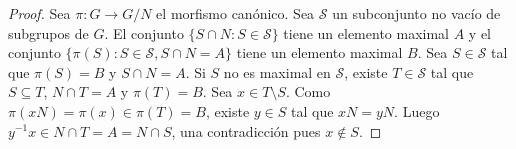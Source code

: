 \begin{proof} 
	Sea $\pi\colon G\to G/N$ el morfismo canónico.  Sea $\mathcal{S}$ un
	subconjunto no vacío de subgrupos de $G$. El conjunto $\{S\cap
	N:S\in\mathcal{S}\}$ tiene un elemento maximal $A$ y el conjunto
	$\{\pi(S):S\in\mathcal{S},S\cap N=A\}$ tiene un elemento maximal $B$. Sea
	$S\in\mathcal{S}$ tal que $\pi(S)=B$ y $S\cap N=A$. Si $S$ no es maximal en
	$\mathcal{S}$, existe $T\in\mathcal{S}$ tal que $S\subseteq T$, $N\cap T=A$
	y $\pi(T)=B$. Sea $x\in T\setminus S$. Como $\pi(xN)=\pi(x)\in\pi(T)=B$,
	existe $y\in S$ tal que $xN=yN$. Luego $y^{-1}x\in N\cap T=A=N\cap S$, una
	contradicción pues $x\not\in S$. 
\end{proof}


%
%
%
%
%
%
%
%	

